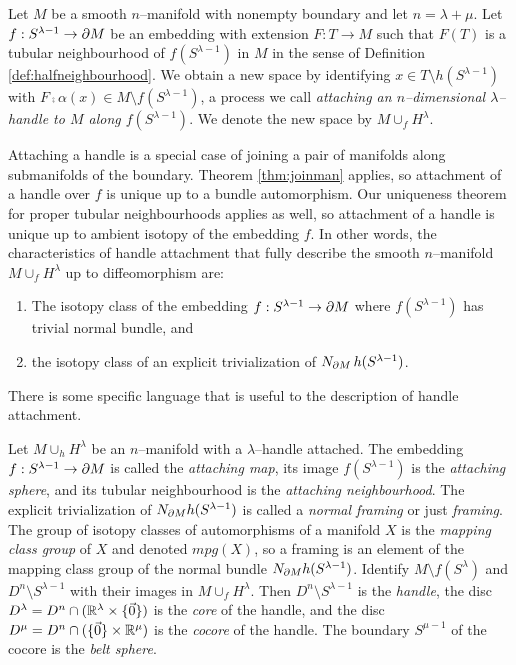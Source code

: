 \begin{defn}[Handle]
	Let $M$ be a smooth $n$--manifold with nonempty boundary and let $n=\lambda+\mu$.
	Let $f:S^{\lambda-1}\to \partial M$ be an embedding with extension $F:T\to M$ such that $F(T)$ is a tubular neighbourhood of $f(S^{\lambda-1})$ in $M$ in the sense of Definition \ref{def:halfneighbourhood}.
	We obtain a new space by identifying $x\in T\setminus h(S^{\lambda-1})$ with $F\comp\alpha(x)\in M\setminus f(S^{\lambda-1})$, a process we call \emph{attaching an $n$--dimensional $\lambda$--handle to $M$ along $f(S^{\lambda-1})$}.
	We denote the new space by $M\cup_f H^\lambda$.	
\end{defn}

Attaching a handle is a special case of joining a pair of manifolds along submanifolds of the boundary.
Theorem \ref{thm:joinman} applies, so attachment of a handle over $f$ is unique up to a bundle automorphism.
Our uniqueness theorem for proper tubular neighbourhoods applies as well, so attachment of a handle is unique up to ambient isotopy of the embedding $f$.
In other words, the characteristics of handle attachment that fully describe the smooth $n$--manifold $M\cup_f H^\lambda$ up to diffeomorphism are:
\begin{enumerate}
	\item The isotopy class of the embedding $f:S^{\lambda-1}\to\partial M$ where $f(S^{\lambda-1})$ has trivial normal bundle, and 
	\item the isotopy class of an explicit trivialization of $N_{\partial M}\,h(S^{\lambda-1})$.
\end{enumerate}

There is some specific language that is useful to the description of handle attachment.

\begin{defn}
	Let $M\cup_h H^\lambda$ be an $n$--manifold with a $\lambda$--handle attached.
	The embedding $f:S^{\lambda-1}\to\partial M$ is called the \emph{attaching map}, its image $f(S^{\lambda-1})$ is the \emph{attaching sphere}, and its tubular neighbourhood is the \emph{attaching neighbourhood}.
	The explicit trivialization of $N_{\partial M}h(S^{\lambda-1})$ is called a \emph{normal framing} or just \emph{framing}.
	The group of isotopy classes of automorphisms of a manifold $X$ is the \emph{mapping class group} of $X$ and denoted $mpg(X)$, so a framing is an element of the mapping class group of the normal bundle $N_{\partial M}h(S^{\lambda-1})$.
	Identify $M\setminus f(S^{\lambda})$ and $D^n\setminus S^{\lambda-1}$ with their images in $M\cup_f H^\lambda$.
	Then $D^n\setminus S^{\lambda-1}$ is the \emph{handle}, the disc $D^\lambda=D^n\cap(\mathbb{R}^\lambda\times\{\vec{0}\})$ is the \emph{core} of the handle, and the disc $D^\mu=D^n\cap(\{\vec{0}\}\times\mathbb{R}^\mu)$ is the \emph{cocore} of the handle.
	The boundary $S^{\mu-1}$ of the cocore is the \emph{belt sphere}.
\end{defn}

